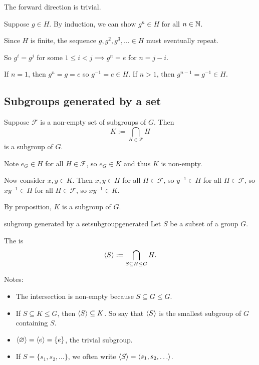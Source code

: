 \documentclass[12pt,letterpaper]{report}
\begin{document}
\begin{thmproof}
  The forward direction is trivial.

  Suppose $g \in H$.
  By induction, we can show $g^n \in H$ for all $n \in \mathbb{N}$.

  Since $H$ is finite, the sequence $g, g^2, g^3, \ldots \in H$ must eventually repeat.

  So $g^i = g^j$ for some $1 \leq i < j \implies g^n = e$ for $n = j - i$.

  If $n = 1$, then $g^n = g = e$ so $g^{-1} = e \in H$.
  If $n > 1$, then $g^{n - 1} = g^{-1} \in H$.
\end{thmproof}

\pagebreak
\subsection{Subgroups generated by a set}

\begin{prop}{}{}
  Suppose $\mathcal{F}$ is a non-empty set of subgroups of $G$.
  Then
  \[ K := \bigcap_{H \in \mathcal{F}} H \]
  is a subgroup of $G$.
\end{prop}

\begin{thmproof}
  Note $e_G \in H$ for all $H \in \mathcal{F}$, so $e_G \in K$ and thus $K$ is non-empty.

  Now consider $x, y \in K$.
  Then $x, y \in H$ for all $H \in \mathcal{F}$, so $y^{-1} \in H$ for all $H \in \mathcal{F}$,
  so $xy^{-1} \in H$ for all $H \in \mathcal{F}$, so $xy^{-1} \in K$.

  By proposition, $K$ is a subgroup of $G$.
\end{thmproof}

\begin{defn}{subgroup generated by a set}{subgroupgenerated}
  Let $S$ be a subset of a group $G$.

  The  is
  \[ \langle S\rangle := \bigcap_{S \subseteq H \leq G} H. \]
\end{defn}

Notes:
\begin{itemize}
  \item The intersection is non-empty because $S \subseteq G \leq G$.
  \item If $S \subseteq K \leq G$, then $\langle S\rangle \subseteq K$.
  So say that $\langle S\rangle$ is the smallest subgroup of $G$ containing $S$.
  \item $\langle\varnothing\rangle = \langle e\rangle = \{e\}$, the trivial subgroup.
  \item If $S = \{s_1, s_2, \ldots\}$, we often write
  $\langle S\rangle = \langle s_1, s_2, \ldots\rangle$.
\end{itemize}
\end{document}
